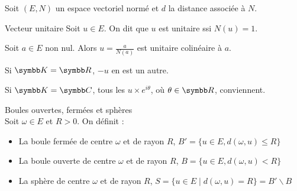 Soit $(E, N)$ un espace vectoriel normé et $d$ la distance associée à $N$. 

\begin{definition}{Vecteur unitaire}{}
    Soit $u \in E$. On dit que $u$ est unitaire ssi $N(u) = 1$.
\end{definition}

\begin{exemple}
    Soit $a \in E$ non nul. 
    Alors $u = \frac{a }{N(a)}$ est unitaire colinéaire à $a$. 

    Si $\K = \R$, $-u$ en est un autre. 

    Si $\K = \C$, tous les $u \times e^{i \theta}$, où $\theta \in \R$, conviennent. 
\end{exemple}


\begin{definition}{Boules ouvertes, fermées et sphères}{}
    \\Soit $\omega \in E$ et $R > 0$. On définit : 
    \begin{itemize}
        \item La boule fermée de centre $\omega$ et de rayon $R$, $B' = \{u \in E, d(\omega, u) \leqslant R\}$
        \item La boule ouverte de centre $\omega$ et de rayon $R$, $B = \{u \in E, d(\omega, u) < R\}$
        \item La sphère de centre $\omega$ et de rayon $R$, $S = \{u \in E \mid d(\omega, u) = R\} = B' \backslash B$
    \end{itemize}  
\end{definition}

